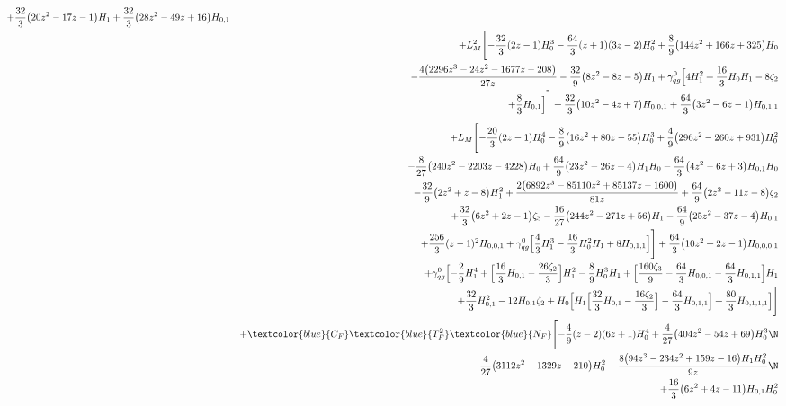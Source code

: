 \begin{eqnarray}
+\frac{32}{3}\big(20 z^2-17 z-1\big) H_1+\frac{32}{3} \big(28 z^2-49 z+16\big) H_{0,1}
\nonumber \\ &&
+L_M^2 \Biggl[-\frac{32}{3} (2 z-1)H_0^3-\frac{64}{3} (z+1) (3 z-2) H_0^2+\frac{8}{9} \big(144 z^2+166 z+325\big)H_0
\nonumber \\ &&
-\frac{4 \big(2296 z^3-24 z^2-1677 z-208\big)}{27 z}
-\frac{32}{9} \big(8z^2-8 z-5\big) H_1+{\gamma}_{qg}^{0} 
\Bigl[4 H_1^2+\frac{16}{3} H_0 H_1-8\zeta_2
\nonumber \\ &&
+\frac{8}{3} H_{0,1}\Bigr]\Biggr]
+\frac{32}{3} \big(10 z^2-4 z+7\big)H_{0,0,1}+\frac{64}{3} \big(3 z^2-6 z-1\big) H_{0,1,1}
\nonumber \\ &&
+L_M \Biggl[-\frac{20}{3} (2 z-1) H_0^4-\frac{8}{9}\big(16 z^2+80 z-55\big) H_0^3+\frac{4}{9} \big(296 z^2-260 z+931\big)H_0^2
\nonumber \\ &&
-\frac{8}{27} \big(240 z^2-2203 z-4228\big) H_0+\frac{64}{9} \big(23z^2-26 z+4\big) H_1 H_0-\frac{64}{3} \big(4 z^2-6 z+3\big) H_{0,1}H_0
\nonumber \\ &&
-\frac{32}{9} \big(2 z^2+z-8\big) H_1^2+\frac{2 \big(6892 z^3-85110  z^2+85137 z-1600\big)}{81 z}+\frac{64}{9} \big(2 z^2-11 z-8\big) \zeta_2
\nonumber \\ &&
+\frac{32}{3} \big(6 z^2+2 z-1\big) \zeta_3-\frac{16}{27} \big(244z^2-271 z+56\big) H_1-\frac{64}{9} \big(25 z^2-37 z-4\big)H_{0,1}
\nonumber \\ &&
+\frac{256}{3} (z-1)^2 H_{0,0,1}+{\gamma}_{qg}^{0}\Bigl[\frac{4}{3} H_1^3-\frac{16}{3} H_0^2 H_1+8H_{0,1,1}\Bigr]\Biggr]+\frac{64}{3} \big(10 z^2+2 z-1\big)H_{0,0,0,1}
\nonumber \\ &&
+{\gamma}_{qg}^{0} \Bigl[-\frac{2}{9} H_1^4+\Bigl[\frac{16}{3}H_{0,1}-\frac{26 \zeta_2}{3}\Bigr] H_1^2-\frac{8}{9} H_0^3H_1+\Bigl[\frac{160 \zeta_3}{9}-\frac{64}{3} H_{0,0,1}-\frac{64}{3}H_{0,1,1}\Bigr] H_1
\nonumber \\ &&
+\frac{32}{3} H_{0,1}^2-12 H_{0,1} \zeta_2+H_0 \Bigl[H_1\Bigl[\frac{32}{3} H_{0,1}-\frac{16 \zeta_2}{3}\Bigr]-\frac{64}{3}H_{0,1,1}\Bigr]+\frac{80}{3} H_{0,1,1,1}\Bigr]
\Biggr]
\nonumber \\ &&
+\textcolor{blue}{C_F}  \textcolor{blue}{T_F^2} \textcolor{blue}{N_F}\Biggl[
-\frac{4}{9} (z-2) (6 z+1) H_0^4
+\frac{4}{27} \big(404 z^2-54 z+69\big) H_0^3
\N\\&&
-\frac{4}{27} \big(3112 z^2-1329 z-210\big) H_0^2
-\frac{8 \big(94 z^3-234 z^2+159 z-16\big) H_1 H_0^2}{9 z}
\N\\&&
+\frac{16}{3} \big(6 z^2+4 z-11\big) H_{0,1} H_0^2

\end{eqnarray}
